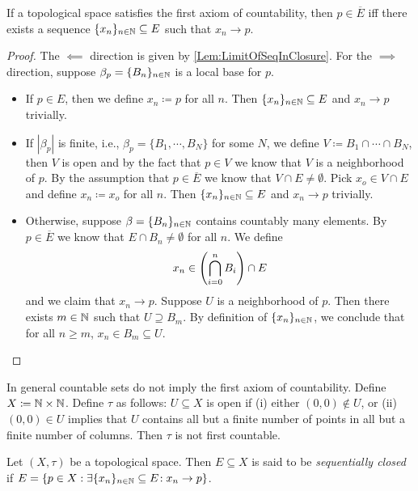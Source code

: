 \documentclass[screen]{techreport}
\numberwithin{equation}{section}
\begin{document}
\begin{lemma}\label{Lem:FirstCountLimitOfSeqIffClosure}
	If a topological space satisfies the first axiom of countability, then $p \in \overline{E}$ iff there exists a sequence $\{x_n\}_{n \in \mathbb{N}} \subseteq E$ such that $x_n \rightarrow p$.
\end{lemma}
\begin{proof}
	The ${\impliedby}$ direction is given by \cref{Lem:LimitOfSeqInClosure}.
	For the ${\implies}$ direction, suppose $\beta_p = \{B_n\}_{n \in \mathbb{N}}$ is a local base for $p$.
	\begin{itemize}
		\item If $p \in E$, then we define $x_n \coloneqq p$ for all $n$.
		Then $\{x_n\}_{n \in \mathbb{N}} \subseteq E$ and $x_n \rightarrow p$ trivially.
		\item If $|\beta_p|$ is finite, i.e., $\beta_p = \{B_1,\cdots,B_N\}$ for some $N$, we define $V \coloneqq B_1 \cap \cdots \cap B_N$, then $V$ is open and by the fact that $p \in V$ we know that $V$ is a neighborhood of $p$.
			By the assumption that $p \in \overline{E}$ we know that $V \cap E \neq \emptyset$.
			Pick $x_o \in V \cap E$ and define $x_n \coloneqq x_o$ for all $n$.
			Then $\{x_n\}_{n \in \mathbb{N}} \subseteq E$ and $x_n \rightarrow p$ trivially.
		\item Otherwise, suppose $\beta=\{B_n\}_{n \in \mathbb{N}}$ contains countably many elements.
			By $p \in \overline{E}$ we know that $E \cap B_n \neq \emptyset$ for all $n$.
			We define
			\[
			x_n \in \left({ \bigcap_{i=0}^n B_i }\right) \cap E
			\]
			and we claim that $x_n \rightarrow p$.
			Suppose $U$ is a neighborhood of $p$.
			Then there exists $m \in \mathbb{N}$ such that $U \supseteq B_m$.
			By definition of $\{x_n\}_{n \in \mathbb{N}}$, we conclude that for all $n \ge m$, $x_n \in B_m \subseteq U$.
	\end{itemize}
\end{proof}

\begin{example}\label{Exa:CountableNotImplyFstCountable}
	In general countable sets do not imply the first axiom of countability.
	Define $X \coloneqq \mathbb{N} \times \mathbb{N}$.
	Define $\tau$ as follows: $U \subseteq X$ is open if (i) either $(0,0) \not\in U$, or (ii) $(0,0) \in U$ implies that $U$ contains all but a finite number of points in all but a finite number of columns.
	Then $\tau$ is not first countable.
\end{example}

\begin{definition}\label{De:SequentiallyClosed}
	Let $(X,\tau)$ be a topological space.
	Then $E \subseteq X$ is said to be \emph{sequentially closed} if $E = \{ p \in X : \exists {\{x_n\}_{n \in \ensuremath{\mathbb{N}}} \subseteq E }\!: x_n \rightarrow p \}$.
\end{definition}
\end{document}
